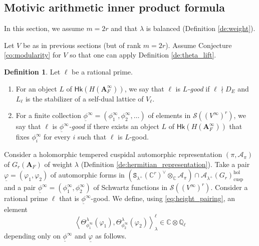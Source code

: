 \documentclass[12pt]{amsart}
\numberwithin{equation}{section}
\theoremstyle{plain}
\theoremstyle{definition}
\newtheorem{definition}[proposition]{Definition}
\theoremstyle{remark}
\renewcommand{\b}[1]{\mathbf{#1}}
\renewcommand{\c}[1]{\mathcal{#1}}
\renewcommand{\d}[1]{\mathbb{#1}}
\renewcommand{\r}[1]{\mathrm{#1}}
\newcommand{\s}[1]{\mathscr{#1}}
\renewcommand{\sf}[1]{\mathsf{#1}}
\renewcommand{\(}{\left(}
\renewcommand{\)}{\right)}
\newcommand{\ul}{\underline}
\newcommand{\bA}{\b A}
\newcommand{\cA}{\c A}
\newcommand{\dC}{\d C}
\newcommand{\dQ}{\d Q}
\newcommand{\sS}{\s S}
\newcommand{\tS}{\mathtt{S}}
\newcommand{\llangle}{\left\langle}
\newcommand{\rrangle}{\right\rangle}
\newcommand{\cusp}{\r{cusp}}
\newcommand{\hol}{\r{hol}}
\newcommand{\Hk}{\sf{Hk}}
\begin{document}
\subsection{Motivic arithmetic inner product formula}
\label{ss:maipf}


In this section, we assume $m=2r$ and that $\lambda$ is balanced (Definition \ref{de:weight}).






Let $V$ be as in previous sections (but of rank $m=2r$). Assume Conjecture \ref{co:modularity} for $V$ so that one can apply Definition \ref{de:theta_lift}.

\begin{definition}\label{de:ell}
Let $\ell$ be a rational prime.
\begin{enumerate}
  \item For an object $L$ of $\Hk(H(\bA_F^\infty))$, we say that $\ell$ is \emph{$L$-good} if $\ell\nmid D_E$ and $L_\ell$ is the stabilizer of a self-dual lattice of $V_\ell$.

  \item For a finite collection $\ul\phi^\infty=(\phi^\infty_1,\phi^\infty_2,\dots)$ of elements in $\sS((V^\infty)^r)$, we say that $\ell$ is \emph{$\ul\phi^\infty$-good} if there exists an object $L$ of $\Hk(H(\bA_F^\infty))$ that fixes $\phi^\infty_i$ for every $i$ such that $\ell$ is $L$-good.
\end{enumerate}
\end{definition}

Consider a holomorphic tempered cuspidal automorphic representation $(\pi,\cA_\pi)$ of $G_r(\bA_F)$ of weight $\lambda$ (Definition \ref{de:hermitian_representation}). Take a pair $\ul\varphi=(\varphi_1,\varphi_2)$ of automorphic forms in $\(\tS_{\lambda^+}(\dC^r)^\vee\otimes_\dC\cA_\pi\)\cap\cA_{\lambda^+}(G_r)_\cusp^\hol$ and a pair  $\ul\phi^\infty=(\phi^\infty_1,\phi^\infty_2)$ of Schwartz functions in $\sS((V^\infty)^r)$. Consider a rational prime $\ell$ that is $\ul\phi^\infty$-good. We define, using \eqref{eq:height_pairing}, an element
\[
\llangle\Theta_{\phi^\infty_1}^\lambda(\varphi_1),\Theta_{\phi^\infty_2}^\lambda(\varphi_2)\rrangle_\lambda^\ell
\in\dC\otimes\dQ_\ell
\]
depending only on $\ul\phi^\infty$ and $\ul\varphi$ as follows.
\end{document}
